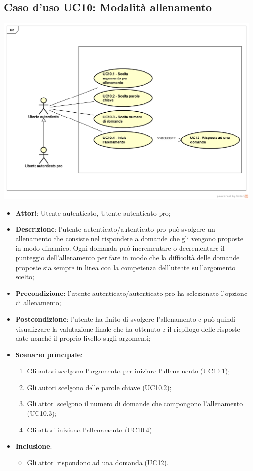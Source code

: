 \subsection{Caso d'uso UC10: Modalità allenamento}
\begin{center}
\includegraphics[scale=0.5]{UML/UC10.png}
\end{center}
\begin{itemize}
\item\textbf{Attori}: Utente autenticato, Utente autenticato pro;
\item\textbf{Descrizione}: l'utente autenticato/autenticato pro può svolgere un allenamento che consiste nel rispondere a domande che gli vengono proposte in modo dinamico. Ogni domanda può incrementare o decrementare il punteggio dell'allenamento per fare in modo che la difficoltà delle domande proposte sia sempre in linea con la competenza dell'utente sull'argomento scelto;
\item\textbf{Precondizione}: l'utente autenticato/autenticato pro ha selezionato l'opzione di allenamento;
\item\textbf{Postcondizione}: l'utente ha finito di svolgere l'allenamento e può quindi visualizzare la valutazione finale che ha ottenuto e il riepilogo delle risposte date nonché il proprio livello sugli argomenti;
\item\textbf{Scenario principale}:
	\begin{enumerate}
		\item Gli autori scelgono l'argomento per iniziare l'allenamento (UC10.1);
		\item Gli autori scelgono delle parole chiave (UC10.2);
		\item Gli attori scelgono il numero di domande che compongono l'allenamento (UC10.3);
		\item Gli attori iniziano l'allenamento (UC10.4).
	\end{enumerate}
\item \textbf{Inclusione}:
	\begin{itemize}
		\item Gli attori rispondono ad una domanda (UC12).
	\end{itemize}
\end{itemize}

